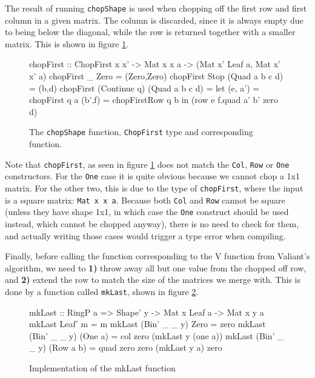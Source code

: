 \documentclass[a4paper,12pt,notitlepage]{report}
\begin{document}
The result of running \texttt{chopShape} is used when chopping off the first row
and first column in a given matrix. The column is discarded, since it is always
empty due to being below the diagonal, while the row is returned together with
a smaller matrix. This is shown in figure \ref{chopfirst}.
\begin{figure}[H]
\begin{code}

chopFirst :: ChopFirst x x' -> Mat x x a  
                            -> (Mat x' Leaf a, Mat x' x' a)
chopFirst _ Zero = (Zero,Zero)
chopFirst Stop (Quad a b c d) = (b,d)
chopFirst (Continue q) (Quad a b c d) =
  let  (e, a') = chopFirst q a
       (b',f)  = chopFirstRow q b
  in (row e f,quad a' b' zero d)
\end{code}
\caption{\label{chopfirst} \small The \texttt{chopShape} function, \texttt{ChopFirst}
type and corresponding function.}
\end{figure}

Note that \texttt{chopFirst}, as seen in figure \ref{chopfirst} does not match
the \texttt{Col}, \texttt{Row} or \texttt{One} constructors. For the
\texttt{One} case it is quite obvious because we cannot chop a 1x1 matrix. For
the other two, this is due to the type of \texttt{chopFirst}, where the input is
a square matrix: \texttt{Mat x x a}. Because both \texttt{Col} and \texttt{Row}
cannot be square (unless they have shape 1x1, in which case the \texttt{One}
construct should be used instead, which cannot be chopped anyway), there is no
need to check for them, and actually writing those cases would trigger a type
error when compiling.

Finally, before calling the function corresponding to the V function from
Valiant's algorithm, we need to \textbf{1)} throw away all but one value from
the chopped off row, and \textbf{2)} extend the row to match the size of the
matrices we merge with. This is done by a function called \texttt{mkLast},
shown in figure \ref{mklast}.

\begin{figure}[H]
\begin{code}
mkLast :: RingP a => Shape' y -> Mat x Leaf a -> Mat x y a
mkLast Leaf' m = m
mkLast (Bin' _ _ y) Zero = zero
mkLast (Bin' _ _ y) (One a) = col zero (mkLast y (one a))
mkLast (Bin' _ _ y) (Row a b) = quad zero zero (mkLast y a) zero
\end{code}
\caption{\label{mklast} \small Implementation of the mkLast function}
\end{figure}
\end{document}
